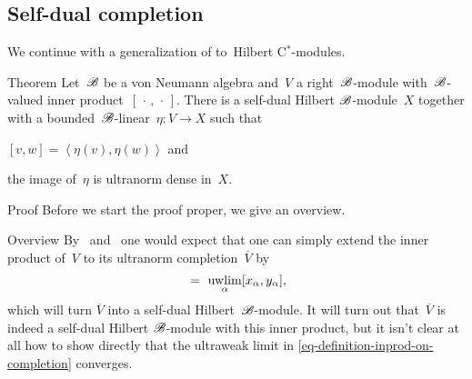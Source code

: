 \documentclass[b]{subfiles}
\begin{document}
\subsection{Self-dual completion}
\begin{parsec}%
\begin{point}%
We continue with a generalization of
to~Hilbert C$^*$-modules.
\end{point}
\begin{point}{Theorem}%
Let~$\mathscr{B}$ be a von Neumann algebra
and~$V$ a right~$\mathscr{B}$-module with~$\mathscr{B}$-valued
    inner product~$[\,\cdot\,,\,\cdot\,]$.
There is a self-dual Hilbert $\mathscr{B}$-module~$X$
    together with a bounded~$\mathscr{B}$-linear~$\eta\colon V \to X$
    such that \begin{inparaenum}
    \item $[v,w] = \left<\eta (v),\eta(w)\right>$
    and \item the image of~$\eta$ is ultranorm dense in~$X$.
    \end{inparaenum}
\begin{point}{Proof}%
Before we start the proof proper,
    we give an overview.
\begin{point}{Overview}
By~ and~
    one would expect that
    one can simply extend the inner product of~$V$
    to its ultranorm completion~$\overline{V}$
    by
    \begin{equation}
        [(x_\alpha)_\alpha, (y_\alpha)_\alpha] \ =\  \uwlim_\alpha [x_\alpha,y_\alpha], \label{eq-definition-inprod-on-completion}
    \end{equation}
    which will turn $\overline{V}$ into a self-dual Hilbert~$\mathscr{B}$-module.
It will turn out that~$\overline{V}$
    is indeed a self-dual Hilbert $\mathscr{B}$-module
    with this inner product,
    but it isn't clear at all  how to show directly that the ultraweak limit
    in \eqref{eq-definition-inprod-on-completion} converges.


\end{point}
\end{point}
\end{point}
\end{parsec}
\end{document}
